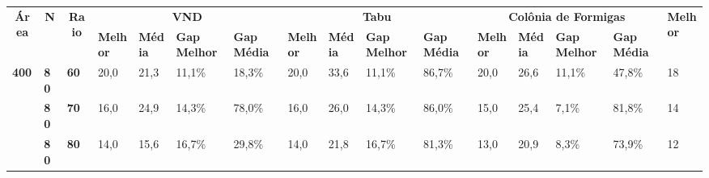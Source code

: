 \documentclass[conference,compsoc]{IEEEtran}
\begin{document}
\begin{adjustbox}{angle=90,width={\textwidth},totalheight={22cm},keepaspectratio,caption={Tabela de Resultados},center={14cm}}
\begin{tabular}{|l|l|l|l|l|l|l|l|l|l|l|l|l|l|l|l|}
\hline
\multicolumn{1}{|c|}{\multirow{2}{*}{\textbf{Área}}} & \multicolumn{1}{c|}{\multirow{2}{*}{\textbf{N}}} & \multicolumn{1}{c|}{\multirow{2}{*}{\textbf{Raio}}} & \multicolumn{4}{c|}{\textbf{VND}}                                           & \multicolumn{4}{c|}{\textbf{Tabu}}                                          & \multicolumn{4}{c|}{\textbf{Colônia de Formigas}}                           & \multirow{2}{*}{\textbf{Melhor}} \\ \cline{4-15}
\multicolumn{1}{|c|}{}                               & \multicolumn{1}{c|}{}                            & \multicolumn{1}{c|}{}                               & \textbf{Melhor} & \textbf{Média} & \textbf{Gap Melhor} & \textbf{Gap Média} & \textbf{Melhor} & \textbf{Média} & \textbf{Gap Melhor} & \textbf{Gap Média} & \textbf{Melhor} & \textbf{Média} & \textbf{Gap Melhor} & \textbf{Gap Média} &                                  \\ \hline
\textbf{400}                                         & \textbf{80}                                      & \textbf{60}                                         & 20,0            & 21,3           & 11,1\%              & 18,3\%             & 20,0            & 33,6           & 11,1\%              & 86,7\%             & 20,0            & 26,6           & 11,1\%              & 47,8\%             & 18                               \\ \hline
\textbf{}                                            & \textbf{80}                                      & \textbf{70}                                         & 16,0            & 24,9           & 14,3\%              & 78,0\%             & 16,0            & 26,0           & 14,3\%              & 86,0\%             & 15,0            & 25,4           & 7,1\%               & 81,8\%             & 14                               \\ \hline
\textbf{}                                            & \textbf{80}                                      & \textbf{80}                                         & 14,0            & 15,6           & 16,7\%              & 29,8\%             & 14,0            & 21,8           & 16,7\%              & 81,3\%             & 13,0            & 20,9           & 8,3\%               & 73,9\%             & 12                               \\ \hline

\end{tabular}
\end{adjustbox}
\end{document}

